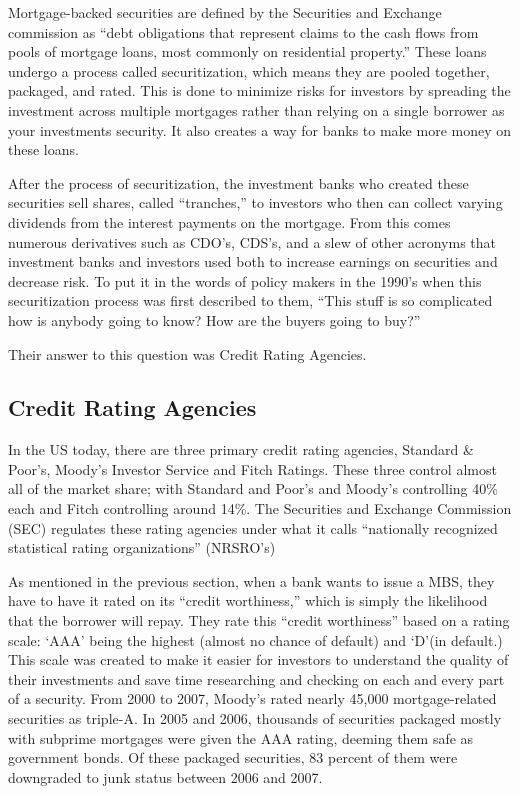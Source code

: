 \documentclass[11pt]{article}
\begin{document}
\begin{multicols}{2}
Mortgage-backed securities are defined by the Securities and Exchange commission as ``debt obligations that represent claims to the cash flows from pools of mortgage loans, most commonly on residential property.'' \cite{secMBS} These loans undergo a process called securitization, which means they are pooled together, packaged, and rated.  This is done to minimize risks for investors by spreading the investment across multiple mortgages rather than relying on a single borrower as your investments security.  It also creates a way for banks to make more money on these loans.  


After the process of securitization, the investment banks who created these securities sell shares, called ``tranches,'' to investors who then can collect varying dividends from the interest payments on the mortgage.  From this comes numerous derivatives such as CDO's, CDS's, and a slew of other acronyms that investment banks and investors used both to increase earnings on securities and decrease risk.  To put it in the words of policy makers in the 1990's when this securitization process was first described to them, ``This stuff is so complicated how is anybody going to know? How are the buyers going to buy?'' \cite[p.~68]{govtReport}  

Their answer to this question was Credit Rating Agencies.

\subsection{Credit Rating Agencies}
In the US today, there are three primary credit rating agencies, Standard \& Poor's, Moody's Investor Service and Fitch Ratings.  These three control almost all of the market share; with Standard and Poor's and Moody's controlling 40\% each and Fitch controlling around 14\%. \cite{wpMoodies}  The Securities and Exchange Commission (SEC) regulates these rating agencies under what it calls ``nationally recognized statistical rating organizations'' (NRSRO's) \cite{CivilLiability} 

As mentioned in the previous section, when a bank wants to issue a MBS, they have to have it rated on its ``credit worthiness,'' which is simply the likelihood that the borrower will repay.  They rate this ``credit worthiness'' based on a rating scale: `AAA' being the highest (almost no chance of default) and `D'(in default.)  \cite{CivilLiability}  This scale was created to make it easier for investors to understand the quality of their investments and save time researching and checking on each and every part of a security.  From 2000 to 2007, Moody's rated nearly 45,000 mortgage-related securities as triple-A. \cite[p.~xxv]{govtReport} In 2005 and 2006, thousands of securities packaged mostly with subprime mortgages were given the AAA rating, deeming them safe as government bonds.  Of these packaged securities, 83 percent of them were downgraded to junk status between 2006 and 2007. \cite[p.~xxv]{govtReport}\cite{ratingEthics}  


\end{multicols}
\end{document}
